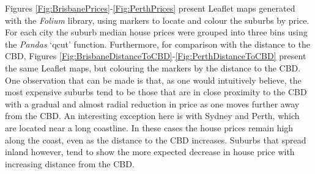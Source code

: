 \documentclass[12pt]{article}
\begin{document}
    Figures \ref{Fig:BrisbanePrices}-\ref{Fig:PerthPrices} present Leaflet maps generated with the \emph{Folium} library, using markers to locate and colour the suburbs by price. For each city the suburb median house prices were grouped into three bins using the \emph{Pandas} `qcut' function. Furthermore, for comparison with the distance to the CBD, Figures \ref{Fig:BrisbaneDistanceToCBD}-\ref{Fig:PerthDistanceToCBD} present the same Leaflet maps, but colouring the markers by the distance to the CBD. One observation that can be made is that, as one would intuitively believe, the most expensive suburbs tend to be those that are in close proximity to the CBD with a gradual and almost radial reduction in price as one moves further away from the CBD. An interesting exception here is with Sydney and Perth, which are located near a long coastline. In these cases the house prices remain high along the coast, even as the distance to the CBD increases. Suburbs that spread inland however, tend to show the more expected decrease in house price with increasing distance from the CBD.
\end{document}
